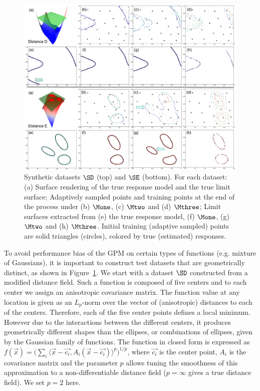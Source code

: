 \begin{figure}[!ht]
\centering
\includegraphics[width=1.0\textwidth]{figs/chap5/synthetic-D-E-DF.pdf}
\caption{Synthetic datasets $\protect\SD$ (top) and $\protect\SE$ (bottom).
For each dataset: (a) Surface rendering of the true response model and the true limit surface; Adaptively sampled points and training points at the end of the process under (b) $\protect\Mone$, (c) $\protect\Mtwo$ and (d) $\protect\Mthree$;
Limit surfaces extracted from (e) the true response model, (f) $\protect\Mone$, (g) $\protect\Mtwo$ and (h) $\protect\Mthree$.
Initial training (adaptive sampled) points are solid triangles (circles), colored by true (estimated)  responses.
}
\label{fig:synthetic-D-E-DF}
\end{figure}

To avoid performance bias of the GPM on certain types of functions (e.g. mixture of Gaussians), it is important to construct test datasets that are geometrically distinct, as shown in Figure~\ref{fig:synthetic-D-E-DF}.
%
We start with a dataset $\SD$ constructed from a modified distance field.
%
Such a function is composed of five centers and to each center we assign an anisotropic covariance matrix.
%
The function value at any location is given as an $L_p$-norm over the vector of (anisotropic) distances to each of the centers.
%
Therefore, each of the five center points defines a local minimum.
%
However due to the interactions between the different centers, it produces geometrically different shapes than the ellipses, or combinations of ellipses, given by the Gaussian family of functions.
%
The function in closed form is expressed as
$f(\vec{x}) = \bigl(\sum_i \langle\vec{x}-\vec{c_i},A_i(\vec{x}-\vec{c_i})
\rangle^{p}\bigr)^{1/p}$, where $\vec{c_i}$ is the center point, $A_i$ is the covariance matrix and the parameter $p$ allows tuning the smoothness of this approximation to a non-differentiable distance field ($p = \infty$ gives a true distance field).
%
We set $p=2$ here.

